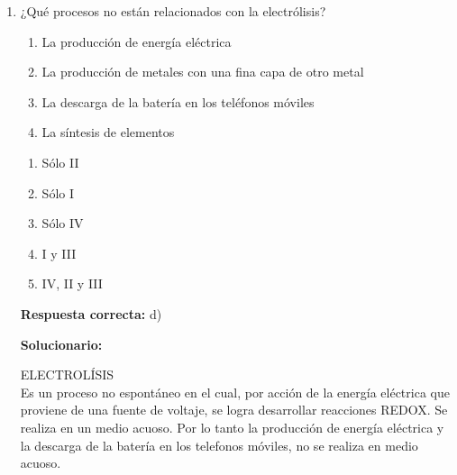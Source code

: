 \begin{enumerate}[resume]
	
	\item ¿Qué procesos no están relacionados con la electrólisis?
	
	\begin{enumerate}[label=\Roman*.]
		\item La producción de energía eléctrica
		\item La producción de metales con una fina capa de otro metal
		\item La descarga de la batería en los teléfonos móviles
		\item La síntesis de elementos 
		
	\end{enumerate}
	
	
	\begin{enumerate}[label=\alph*)]
		\item Sólo II
		\item Sólo I
		\item Sólo IV
		\item I y III
		\item IV, II y III
	\end{enumerate}
	
	\textbf{Respuesta correcta:} d)
	
	\vspace{2mm}
	\textbf{Solucionario:}
	
	ELECTROLÍSIS\\
	Es un proceso no espontáneo en el cual, por acción de la energía eléctrica que proviene de una fuente de voltaje, se logra desarrollar reacciones REDOX. Se realiza en un medio acuoso. Por lo tanto la producción de energía eléctrica y la descarga de la batería en los telefonos móviles, no  se realiza en medio acuoso.
	
	
\end{enumerate}


